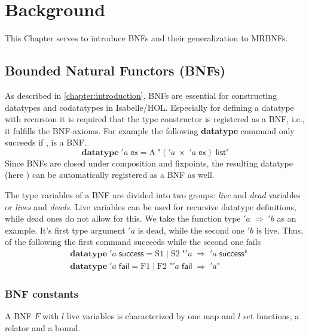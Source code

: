 
\chapter{Background}
\label{chapter:background}

  This Chapter serves to introduce \acp{BNF} and their generalization to \acp{MRBNF}. 
  \section{Bounded Natural Functors (BNFs)}
    As described in \autoref{chapter:introduction}, \acp{BNF} are essential for constructing datatypes and codatatypes in Isabelle/HOL. Especially for defining a datatype with recursion it is required that the type constructor  is registered as a \ac{BNF}, i.e., it fulfills the \ac{BNF}-axioms. For example the following \textbf{datatype} command only succeeds if , is a \ac{BNF}.
    \begin{equation*}
      \textbf{datatype}\; 'a\; \textsf{ex} = \text{A}\; \text{"}('a\; \times\; 'a\; \textsf{ex})\; \textsf{list}\text{"}
    \end{equation*}
    Since \acp{BNF} are closed under composition and fixpoints, the resulting datatype (here ) can be automatically registered as a \ac{BNF} as well.

    The type variables of a \ac{BNF} are divided into two groups: \textit{live} and \textit{dead} variables or \textit{lives} and \textit{deads}. Live variables can be used for recursive datatype definitions, while dead ones do not allow for this. We take the function type $'a\; \Rightarrow\; 'b$ as an example. It's first type argument $'a$ is dead, while the second one $'b$ is live. Thus, of the following the first command succeeds while the second one fails
    \begin{align*}
      &\textbf{datatype}\; 'a\; \textsf{success} = \text{S1}\; |\; \text{S2}\; \text{"}'a\; \Rightarrow\; 'a\; \textsf{success}\text{"}\\
      &\textbf{datatype}\; 'a\; \textsf{fail} = \text{F1}\; |\; \text{F2}\; \text{"}'a\; \textsf{fail}\; \Rightarrow\; 'a\text{"}
    \end{align*}

    \subsection{BNF constants}
      A \ac{BNF} $F$ with $l$ live variables is characterized by one map and $l$ set functions, a relator and a bound. 

